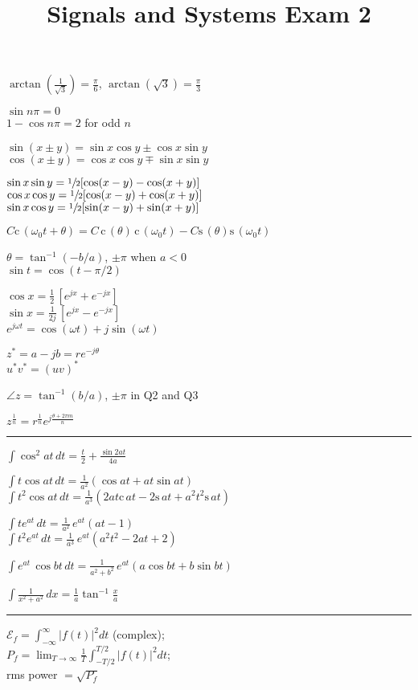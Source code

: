 \documentclass[4pt]{article}
\title{Signals and Systems Exam 2}
\theoremstyle{definition}
\theoremstyle{definition}
\renewcommand{\c}{\mathrm{c}\,}
\newcommand{\s}{\mathrm{s}\,}
\renewcommand{\o}{\omega}
\begin{document}
\raggedright
\begin{multicols}{3} %
    $\arctan(\frac{1}{\sqrt{3}}) = \frac{\pi}{6}$,  $\arctan(\sqrt{3}) = \frac{\pi} 3$

    $\sin n\pi = 0$\\
    $1-\cos n\pi = 2$ for odd $n$

    $\sin(x\pm y) = \sin x \cos y \pm \cos x \sin y$\\
    $\cos(x\pm y) = \cos x \cos y \mp \sin x \sin y$

    $\sin x \sin y = \sfrac{1}{2}[\cos(x-y) - \cos(x+y)]$\\ %
    $\cos x \cos y = \sfrac{1}{2}[\cos(x-y) + \cos(x+y)]$\\
    $\sin x \cos y = \sfrac{1}{2}[\sin(x-y) + \sin(x+y)]$

    $C \c(\omega_0 t + \theta) = C\,\c(\theta) \,\c(\omega_0 t) - C\s(\theta)\s(\o_0 t)$

    $\theta = \tan^{-1} (-b/a)$, $\pm \pi$ when $a<0$\\
    $\sin t = \cos (t-\pi/2)$

    $\cos x = \frac{1}{2}\,[e^{jx} + e^{-jx}]$\\
    $\sin x = \frac{1}{2j}\, [e^{jx} - e^{-jx}]$\\
    $e^{j\omega t} = \cos(\omega t) + j\sin (\omega t)$

    $z^* = a-jb = re^{-j\theta}$\\
    $u^* v^* = (uv)^*$

    $\angle z = \tan^{-1}(b/a)$, $\pm \pi$ in Q2 and Q3

    $z^{\frac 1 n} = r^{\frac 1 n} e^{j \frac{\theta + 2\pi m}{n}}$
\rule{\linewidth}{0.5pt}
    $\int \cos^2 at \, dt = \frac{t}{2} + \frac{\sin2at}{4a}$

    $\int t \cos at \, dt = \frac{1}{a^2}(\cos at + at\sin at)$\\
    $\int t^2 \cos at\, dt = \frac{1}{a^3}(2at\c at - 2\s at + a^2t^2\s at)$

    $\int te^{at}\, dt = \frac{1}{a^2} \, e^{at} (at-1)$\\
    $\int t^2 e^{at} \, dt = \frac{1}{a^3} \, e^{at} (a^2t^2 - 2at + 2)$

    $\int e^{at} \,\cos bt \, dt = \frac{1}{a^2+b^2} \,e^{at}(a\cos 
    bt + b \sin bt)$

    \(\int \frac{1} {x^2+a^2}\, dx = \frac{1}{a} \tan^{-1} \frac x a\)
    \rule{\linewidth}{0.5pt}
    $\mathcal{E}_f = \int_{-\infty}^{\infty} |f(t)|^2 dt$ (complex); \\
    $P_f = \lim_{T\rightarrow\infty}\frac{1}{T} \int^{T/2}_{-T/2} |f(t)|^2 dt $; \\
    rms power $= \sqrt {P_f}$


\end{multicols}
\end{document}
